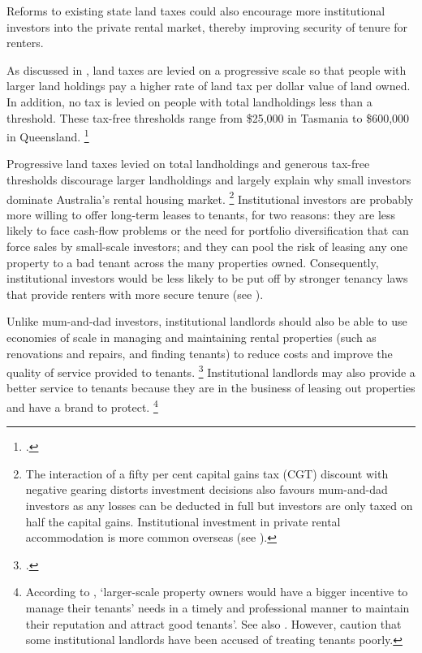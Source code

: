 Reforms to existing state land taxes could also encourage more institutional investors into the private rental market, thereby improving security of tenure for renters.

As discussed in , land taxes are levied on a progressive scale so that people with larger land holdings pay a higher rate of land tax per dollar value of land owned.
In addition, no tax is levied on people with total landholdings less than a threshold.
These tax-free thresholds range from \$25,000 in Tasmania to \$600,000 in Queensland.%
	\footcite{NSW-Treasury-2016-Interstate-comparison-taxes-201516}

Progressive land taxes levied on total landholdings and generous tax-free thresholds discourage larger landholdings and largely explain why small investors dominate Australia's rental housing market.%
    \footnote{The interaction of a fifty per cent capital gains tax (CGT) discount with negative gearing distorts investment decisions also favours mum-and-dad investors as any losses can be deducted in full but investors are only taxed on half the capital gains. Institutional investment in private rental accommodation is more common overseas (see \textcite[][Table~7]{AHURI_2018_private_rental_housing_Martin_etal}).}
Institutional investors are probably more willing to offer long-term leases to tenants, for two reasons: they are less likely to face cash-flow problems or the need for portfolio diversification that can force sales by small-scale investors; and they can pool the risk of leasing any one property to a bad tenant across the many properties owned. Consequently, institutional investors would be less likely to be put off by stronger tenancy laws that provide renters with more secure tenure (see ).

Unlike mum-and-dad investors, institutional landlords should also be able to use economies of scale in managing and maintaining rental properties (such as renovations and repairs, and finding tenants) to reduce costs and improve the quality of service provided to tenants.%
	\footcites{PwC-2017-A-fixed-abode}{Freebairn2016Housing}[][417]{HenryTaxReview2010-Part2-Detailed-analysis}
Institutional landlords may also provide a better service to tenants because they are in the business of leasing out properties and have a brand to protect.%
	\footnote{According to \textcite{Irvine-2016-SMH-Hidden-tax-hurts-renters}, `larger-scale property owners would have a bigger incentive to manage their tenants' needs in a timely and professional manner to maintain their reputation and attract good tenants'.
	See also \textcite{Duke-2017-Domain-Speculative-investors-cause-rent-pain}. However, \textcite{AHURI_2018_private_rental_housing_Martin_etal} caution that some institutional landlords have been accused of treating tenants poorly.}

